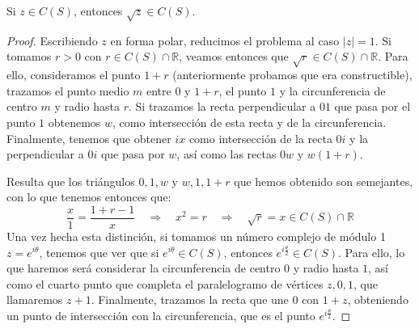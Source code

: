 \begin{lema}
    Si $z\in C(S)$, entonces $\sqrt{z}\in C(S)$.
    \begin{proof}
        Escribiendo $z$ en forma polar, reducimos el problema al caso $|z| = 1$. Si tomamos $r>0$ con $r\in C(S)\cap \mathbb{R}$, veamos entonces que $\sqrt{r}\in C(S)\cap \mathbb{R}$. Para ello, consideramos el punto $1+r$ (anteriormente probamos que era constructible), trazamos el punto medio $m$ entre $0$ y $1+r$, el punto $1$ y la circunferencia de centro $m$ y radio hasta $r$. Si trazamos la recta perpendicular a $01$ que pasa por el punto $1$ obtenemos $w$, como intersección de esta recta y de la circunferencia. Finalmente, tenemos que obtener $ix$ como intersección de la recta $0i$ y la perpendicular a $0i$ que pasa por $w$, así como las rectas $0w$ y $w(1+r)$.
        \begin{figure}[H]
            \centering
        \end{figure}
        Resulta que los triángulos $0, 1, w$ y $w, 1, 1+r$ que hemos obtenido son semejantes, con lo que tenemos entonces que:
        \begin{equation*}
            \dfrac{x}{1} = \dfrac{1+r-1}{x}\quad  \Longrightarrow \quad  x^2 = r \quad  \Longrightarrow\quad   \sqrt{r} = x \in C(S)\cap \mathbb{R}
        \end{equation*}
        Una vez hecha esta distinción, si tomamos un número complejo de módulo 1 $z=e^{i\theta}$, tenemos que ver que si $e^{i\theta}\in C(S)$, entonces $e^{i\frac{\theta}{2}}\in C(S)$. Para ello, lo que haremos será considerar la circunferencia de centro $0$ y radio hasta $1$, así como el cuarto punto que completa el paralelogramo de vértices $z,0,1$, que llamaremos $z+1$. Finalmente, trazamos la recta que une $0$ con $1+z$, obteniendo un punto de intersección con la circunferencia, que es el punto $e^{i\frac{\theta}{2}}$.

\end{proof}
\end{lema}
